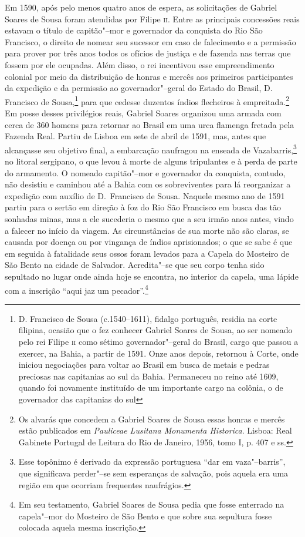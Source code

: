 \documentclass[12pt]{extarticle}
\begin{document}
{Em 1590, após pelo menos quatro anos de espera, as solicitações de
Gabriel Soares de Sousa foram atendidas por Filipe \textsc{ii}. Entre as
principais concessões reais estavam o título de capitão"--mor e
governador da conquista do Rio São Francisco, o direito de nomear seu
sucessor em caso de falecimento e a permissão para prover por três anos
todos os ofícios de justiça e de fazenda nas terras que fossem por ele
ocupadas. Além disso, o rei incentivou esse empreendimento colonial por
meio da distribuição de honras e mercês aos primeiros participantes da
expedição e da permissão ao governador"--geral do Estado do Brasil, D.
Francisco de Sousa,\footnote{ D. Francisco de Sousa (c.1540--1611),
fidalgo português, residia na corte filipina, ocasião que o fez
conhecer Gabriel Soares de Sousa, ao ser nomeado pelo rei Filipe 	\textsc{ii}
como sétimo governador"--geral do Brasil, cargo que passou a exercer, na
Bahia, a partir de 1591. Onze anos depois, retornou à Corte, onde
iniciou negociações para voltar ao Brasil em busca de metais e pedras
preciosas nas capitanias ao sul da Bahia. Permaneceu no reino até 1609,
quando foi novamente instituído de um importante cargo na colônia, o de
governador das capitanias do sul} para que cedesse duzentos índios
flecheiros à empreitada.\footnote{ Os alvarás que concedem a Gabriel
Soares de Sousa essas honras e mercês estão publicados em\textit{
Pauliceae Lusitana Monumenta Historica}. Lisboa: Real Gabinete Portugal
de Leitura do Rio de Janeiro, 1956, tomo I, p. 407 e ss.} Em posse
desses privilégios reais, Gabriel Soares organizou uma armada com cerca
de 360 homens para retornar ao Brasil em uma urca
flamenga fretada pela Fazenda Real. Partiu de Lisboa em sete de abril
de 1591, mas, antes que alcançasse seu objetivo final, a embarcação
naufragou na enseada de Vazabarris,\footnote{ Esse topônimo é derivado
da expressão portuguesa “dar em vaza"--barris”, que significava perder"--se
sem esperanças de salvação, pois aquela era uma região em que ocorriam
frequentes naufrágios.} no litoral sergipano, o que levou à morte de
alguns tripulantes e à perda de parte do armamento. O nomeado
capitão"--mor e governador da conquista, contudo, não desistiu e caminhou
até a Bahia com os sobreviventes para lá reorganizar a expedição com
auxílio de D.~Francisco de Sousa. Naquele mesmo ano de 1591 partiu para
o sertão em direção à foz do Rio São Francisco em busca das tão
sonhadas minas, mas a ele sucederia o mesmo que a seu irmão anos antes,
vindo a falecer no início da viagem. As circunstâncias de sua morte não
são claras, se causada por doença ou por vingança de índios
aprisionados; o que se sabe é que em seguida à fatalidade seus ossos
foram levados para a Capela do Mosteiro de São Bento na cidade de
Salvador. Acredita"--se que seu corpo tenha sido sepultado no lugar onde
ainda hoje se encontra, no interior da capela, uma lápide com a
inscrição ``aqui jaz um pecador''.\footnote{ Em seu
testamento, Gabriel Soares de Sousa pedia que fosse enterrado na 
capela"--mor do Mosteiro de São Bento e que sobre sua sepultura fosse colocada
aquela mesma inscrição.}

}
\end{document}

